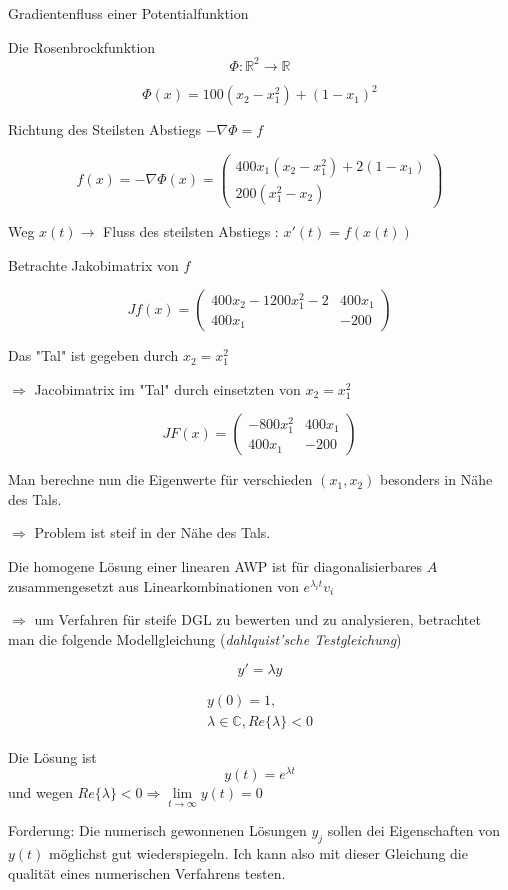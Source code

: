 \documentclass[10pt,a4paper]{article}
\begin{document}
\begin{bsp}
Gradientenfluss einer Potentialfunktion

Die Rosenbrockfunktion
$$\Phi: \mathbb{R}^{2} \rightarrow \mathbb{R}$$

$$\Phi(x)=100(x_2-x_1^{2})+(1-x_1)^{2}$$

Richtung des Steilsten Abstiegs $-\nabla \Phi = f$

$$ f(x) = -\nabla \Phi(x) = \begin{pmatrix}
400 x_1(x_2-x_1^{2})+2(1-x_1)\\
200(x_1^{2}-x_2)
\end{pmatrix}
$$

Weg $x(t) \rightarrow$ Fluss des steilsten Abstiegs : $x'(t)=f(x(t))$

Betrachte Jakobimatrix von $f$

$$Jf(x)=\begin{pmatrix}
400x_2-1200x_1^{2}-2 & 400x_1 \\
400x_1 & -200
\end{pmatrix}
$$

Das "Tal" ist gegeben durch $x_2=x_1^{2}$

$\Rightarrow$ Jacobimatrix im "Tal" durch einsetzten von  $x_2=x_1^{2}$

$$
JF(x) = \begin{pmatrix}
-800x_1^{2} & 400x_1 \\
400 x_1 & -200
\end{pmatrix}
$$

Man berechne nun die Eigenwerte für verschieden $(x_1,x_2)$ besonders in Nähe des Tals.

$\Rightarrow$ Problem ist steif in der Nähe des Tals.

\end{bsp}

Die homogene Lösung einer linearen AWP ist für diagonalisierbares $A$ zusammengesetzt aus Linearkombinationen von $e^{\lambda_i t}v_i$

$\Rightarrow$ um Verfahren für steife DGL zu bewerten und zu analysieren, betrachtet man die folgende Modellgleichung (\emph{dahlquist'sche Testgleichung})

\begin{defi}

\begin{equation}
y'=\lambda y 
\end{equation}

\begin{eqnarray*}
 y(0)=1, \\
 \lambda \in \mathbb{C}, Re\{ \lambda \} < 0
\end{eqnarray*}

Die Lösung ist $$y(t)=e^{\lambda t}$$ und wegen $Re\{ \lambda \} < 0 \Rightarrow \lim\limits_{t \rightarrow \infty} y(t)=0$

Forderung: Die numerisch gewonnenen Lösungen $y_j$ sollen dei Eigenschaften von $y(t)$ möglichst gut wiederspiegeln. Ich kann also mit dieser Gleichung die qualität eines numerischen Verfahrens testen.

\end{defi}
\end{document}
